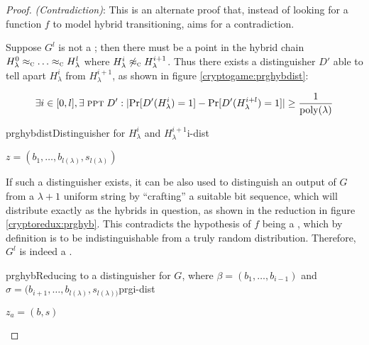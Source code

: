 \begin{proof}
    \textit{(Contradiction)}: This is an alternate proof that, instead of looking for a function $f$ to model hybrid transitioning, aims for a contradiction.
    
    Suppose $G^{l}$ is not a \prg; then there must be a point in the hybrid chain $H_{\lambda}^{0} \compindist \dots \compindist H_{\lambda}^{l}$ where $H_{\lambda}^{i} \not\approx_\textsc{c} H_{\lambda}^{i+1}$. Thus there exists a distinguisher $D'$ able to tell apart $H_{\lambda}^{i}$ from $H_{\lambda}^{i+1}$, as shown in figure \ref{cryptogame:prghybdist}:

    \begin{equation*}
        \exists i \in [0,l], \exists\; \textsc{ppt}\; D' : \lvert\Pr[D'(H_{\lambda}^{i}) = 1] - \Pr[D'(H_{\lambda}^{i+l}) = 1]\rvert \geq \frac{1}{\mathrm{poly}{(\lambda)}}
    \end{equation*}

    \begin{cryptogame}{prghybdist}{Distinguisher for $H_{\lambda}^{i}$ and $H_{\lambda}^{i+1}$}{i-dist}

        {$z = (b_{1}, \dots ,b_{l(\lambda)}, s_{l(\lambda)})$}{}

        \cseqdelay
        

    \end{cryptogame}

    If such a distinguisher exists, it can be also used to distinguish an output of $G$ from a $\lambda+1$ uniform string by ``crafting'' a suitable bit sequence, which will distribute exactly as the hybrids in question, as shown in the reduction in figure \ref{cryptoredux:prghyb}. This contradicts the hypothesis of $f$ being a \prg, which by definition is to be indistinguishable from a truly random distribution. Therefore, $G^l$ is indeed a \prg.

    \begin{cryptoredux}{prghyb}{Reducing to a distinguisher for $G$, where $\beta = (b_1, \dots, b_{i-1})$ and $\sigma = (b_{i+1}, \dots, b_{l(\lambda)}, s_{l(\lambda))}$}{prg}{i-dist}

        {$z_a = (b, s)$}{}


\end{cryptoredux}
\end{proof}
